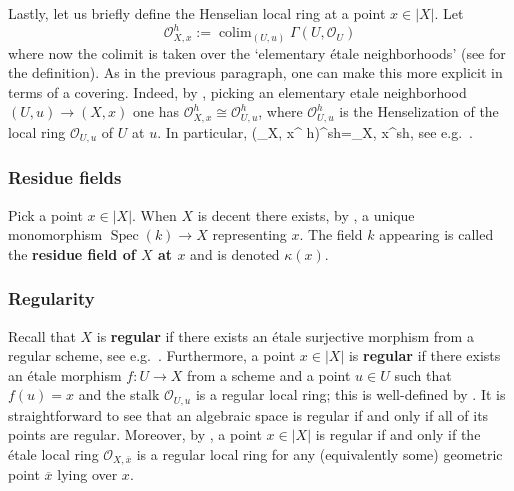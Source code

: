 \documentclass[11pt]{amsart}
\let\oldequation\equation
\let\oldendequation\endequation
\renewenvironment{equation}{\linenomathNonumbers\oldequation}{\oldendequation\endlinenomath}
\theoremstyle{plain}
\theoremstyle{definition}
\numberwithin{equation}{section}
\numberwithin{theorem}{section}
\begin{document}
Lastly, let us briefly define the Henselian local ring at a point $x\in |X|$.
Let
\begin{displaymath}
    \mathcal{O}_{X, x}^ h := \mathop{\mathrm{colim}}\nolimits_{(U,u)} \Gamma (U, \mathcal{O}_ U)
\end{displaymath}
where now the colimit is taken over the `elementary \'{e}tale neighborhoods' (see \cite[\href{https://stacks.math.columbia.edu/tag/0BGU}{Tag 0BGU}]{StacksProject} for the definition).
As in the previous paragraph, one can make this more explicit in terms of a covering. 
Indeed, by \cite[\href{https://stacks.math.columbia.edu/tag/0EMY}{Tag 0EMY}]{StacksProject}, picking an elementary etale neighborhood $(U,u)\to (X,x)$ one has $\mathcal{O}_{X, x}^ h \cong \mathcal{O}_{U,u}^{h}$, where $\mathcal{O}_{U,u}^{h}$ is the Henselization of the local ring $\mathcal{O}_{U,u}$ of $U$ at $u$.
In particular, 
\begin{equation}\label{eq:hens_local_ring}
    (_{X, x}^ h)^{sh}=_{X, x}^{sh},
\end{equation}
see e.g.\ \cite[\href{https://stacks.math.columbia.edu/tag/0EMZ}{Tag 0EMZ}]{StacksProject}.

\subsubsection{Residue fields}
\label{sec:prelim_spaces_residue_fields}

Pick a point $x\in |X|$. 
When $X$ is decent there exists, by \cite[\href{https://stacks.math.columbia.edu/tag/03K4}{Tag 03K4}]{StacksProject}, a unique monomorphism $\operatorname{Spec}(k)\to X$ representing $x$.
The field $k$ appearing is called the \textbf{residue field of $X$ at $x$} and is denoted $\kappa(x)$. 

\subsubsection{Regularity}
\label{sec:prelim_spaces_regularity}

Recall that $X$ is \textbf{regular} if there exists an \'{e}tale surjective morphism from a regular scheme, see e.g.\ \cite[\href{https://stacks.math.columbia.edu/tag/03E5}{Tag 03E5}]{StacksProject}. 
Furthermore, a point $x\in |X|$ is \textbf{regular} if there exists an \'{e}tale morphism $f\colon U \to X$ from a scheme and a point $u\in U$ such that $f(u)=x$ and the stalk $\mathcal{O}_{U,u}$ is a regular local ring; this is well-defined by \cite[\href{https://stacks.math.columbia.edu/tag/0AH7}{Tag 0AH7}]{StacksProject}.
It is straightforward to see that an algebraic space is regular if and only if all of its points are regular.
Moreover, by \cite[\href{https://stacks.math.columbia.edu/tag/0AHA}{Tag 0AHA}]{StacksProject}, a point $x\in |X|$ is regular if and only if the \'{e}tale local ring $\mathcal{O}_{X,\overline{x}}$ is a regular local ring for any (equivalently some) geometric point $\overline{x}$ lying over $x$.
\end{document}
